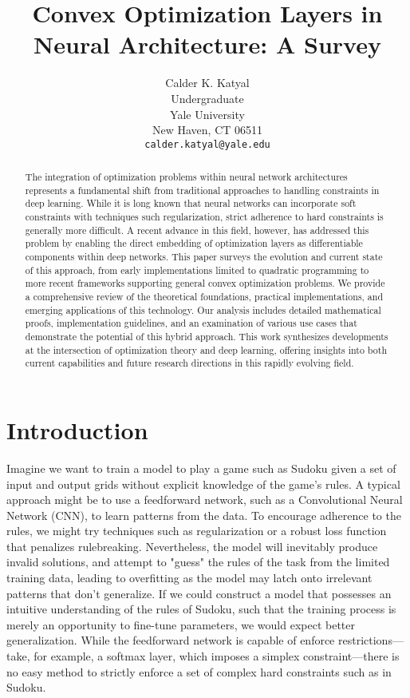 \documentclass{article}
\title{Convex Optimization Layers in Neural Architecture: A Survey}
\author{%
  Calder K. Katyal\\
  Undergraduate\\
  Yale University\\
  New Haven, CT 06511 \\
  \texttt{calder.katyal@yale.edu} \\
}
\begin{document}
\maketitle

\begin{abstract}
    The integration of optimization problems within neural network architectures represents a fundamental shift from traditional approaches to handling constraints in deep learning. While it is long known that neural networks can incorporate soft constraints with techniques such regularization, strict adherence to hard constraints is generally more difficult. A recent advance in this field, however, has addressed this problem by enabling the direct embedding of optimization layers as differentiable components within deep networks. This paper surveys the evolution and current state of this approach, from early implementations limited to quadratic programming to more recent frameworks supporting general convex optimization problems. We provide a comprehensive review of the theoretical foundations, practical implementations, and emerging applications of this technology. Our analysis includes detailed mathematical proofs, implementation guidelines, and an examination of various use cases that demonstrate the potential of this hybrid approach. This work synthesizes developments at the intersection of optimization theory and deep learning, offering insights into both current capabilities and future research directions in this rapidly evolving field. 
\end{abstract}
\section{Introduction}
Imagine we want to train a model to play a game such as Sudoku given a set of input and output grids without explicit knowledge of the game's rules. A typical approach might be to use a feedforward network, such as a Convolutional Neural Network (CNN), to learn patterns from the data. To encourage adherence to the rules, we might try techniques such as regularization or a robust loss function that penalizes rulebreaking. Nevertheless, the model will inevitably produce invalid solutions, and attempt to "guess" the rules of the task from the limited training data, leading to overfitting as the model may latch onto irrelevant patterns that don’t generalize. If we could construct a model that possesses an intuitive understanding of the rules of Sudoku, such that the training process is merely an opportunity to fine-tune parameters, we would expect better generalization. While the feedforward network is capable of enforce restrictions—take, for example, a softmax layer, which imposes a simplex constraint—there is no easy method to strictly enforce a set of complex hard constraints such as in Sudoku. \citet{optnet}
\end{document}
